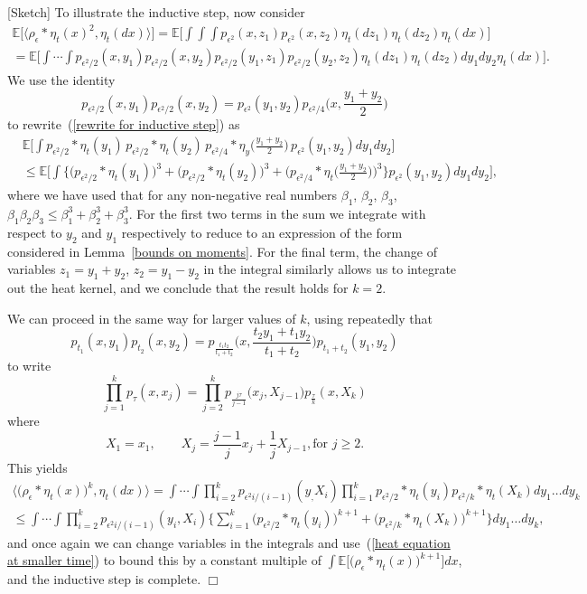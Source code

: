 \documentclass[12pt]{article}
\newenvironment {proof}{{\noindent\bf Proof }}{\hfill $\Box$ \medskip}
\newcommand{\IE}{\mathbb E}
\numberwithin{equation}{section}
\begin{document}
\begin{proof}[Sketch]
To illustrate the inductive step, now consider
\begin{multline}
\label{rewrite for inductive step}
\IE\big[\langle \rho_\epsilon*\eta_t(x)^2,\eta_t(dx)\rangle\big] 
=
\IE\Big[\int\int\int p_{\epsilon^2}(x,z_1) p_{\epsilon^2}(x,z_2)
\eta_t(dz_1)\eta_t(dz_2)\eta_t(dx)\Big]
\\
=
\IE\Big[\int\cdots\int p_{\epsilon^2/2}(x,y_1) 
p_{\epsilon^2/2}(x,y_2)p_{\epsilon^2/2}(y_1,z_1)
p_{\epsilon^2/2}(y_2,z_2)
\eta_t(dz_1)\eta_t(dz_2)dy_1dy_2\eta_t(dx)\Big].
\end{multline}
We use the identity
\[
p_{\epsilon^2/2}(x,y_1) p_{\epsilon^2/2}(x,y_2)
=p_{\epsilon^2}(y_1,y_2)p_{\epsilon^2/4}\Big(x, \frac{y_1+y_2}{2}\Big)
\]
to rewrite~(\ref{rewrite for inductive step}) as
\begin{align*}
&\IE\Big[\int p_{\epsilon^2/2}*\eta_t(y_1)\, p_{\epsilon^2/2}*\eta_t(y_2)\,
p_{\epsilon^2/4}*\eta_y\big(\frac{y_1+y_2}{2}\big)\, 
p_{\epsilon^2}(y_1,y_2)dy_1dy_2\Big]
\\
&\leq 
\IE\Big[\int\Big\{
\big(p_{\epsilon^2/2}*\eta_t(y_1)\big)^3+ \big(p_{\epsilon^2/2}*\eta_t(y_2)\big)^3+
\big(p_{\epsilon^2/4}*\eta_t\big(\frac{y_1+y_2}{2}\big)\big)^3
\Big\}p_{\epsilon^2}(y_1,y_2)dy_1dy_2\Big],
\end{align*}
where we have used that for any non-negative real numbers
$\beta_1$, $\beta_2$, $\beta_3$, 
$\beta_1\beta_2\beta_3\leq \beta_1^3+\beta_2^3+\beta_3^3$.
For the first two terms in the sum we integrate with respect to $y_2$ and $y_1$
respectively to reduce to an expression of the form considered in 
Lemma~\ref{bounds on moments}. For the final term, the change of variables
$z_1=y_1+y_2$, $z_2=y_1-y_2$ in the integral similarly 
allows us to integrate out the heat kernel, and we conclude that the result
holds for $k=2$.

We can proceed in the same way for larger values of $k$, using repeatedly that
\[
p_{t_1}(x,y_1)p_{t_2}(x,y_2)=p_{\frac{t_1t_2}{t_1+t_2}}
\Big(x,\frac{t_2y_1+t_1y_2}{t_1+t_2}\Big)p_{t_1+t_2}(y_1,y_2)
\]
to write 
\[
\prod_{j=1}^k p_{\tau}(x,x_j)
=\prod_{j=2}^{k}p_{\frac{j\tau}{j-1}}\big(x_j,X_{j-1}\big)
p_{\frac{\tau}{k}}(x, X_k)
\]
where
\[
X_1=x_1, \qquad X_j=\frac{j-1}{j}x_j+\frac{1}{j}X_{j-1}, \mbox{for }j\geq 2.
\]
This yields
\begin{multline*}
\big\langle\big(\rho_\epsilon*\eta_t(x)\big)^k,\eta_t(dx)\big\rangle
=\int\cdots\int\prod_{i=2}^kp_{\epsilon^2 i/(i-1)}(y_,X_i)
\prod_{i=1}^kp_{\epsilon^2/2}*\eta_t(y_i)p_{\epsilon^2/k}*\eta_t(X_k)
dy_1\ldots dy_k
\\
\leq
\int\cdots\int 
\prod_{i=2}^kp_{\epsilon^2 i/(i-1)}(y_i,X_i)
\Big\{\sum_{i=1}^k\big(p_{\epsilon^2/2}*\eta_t(y_i)\big)^{k+1}
+\big(p_{\epsilon^2/k}*\eta_t(X_k)\big)^{k+1}\Big\}dy_1\ldots dy_k,
\end{multline*}
and once again we can change variables in the integrals and 
use~(\ref{heat equation at smaller time}) to bound this by a constant 
multiple of $\int\IE\big[\big(\rho_\epsilon*\eta_t(x)\big)^{k+1}\big]dx$, and
the inductive step is complete.
\end{proof}
\end{document}
